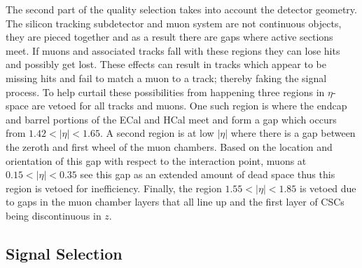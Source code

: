 \documentclass[a4paper,12pt]{article}
\begin{document}
        The second part of the quality selection takes into account the detector
        geometry. The silicon tracking subdetector and muon system are not
        continuous objects, they are pieced together and as a result there are
        gaps where active sections meet. If muons and associated tracks fall
        with these regions they can lose hits and possibly get lost. These
        effects can result in tracks which appear to be missing hits and fail to
        match a muon to a track; thereby faking the signal process. To help
        curtail these possibilities from happening three regions in $\eta$-space
        are vetoed for all tracks and muons. One such region is where the endcap
        and barrel portions of the ECal and HCal meet and form a gap which
        occurs from $1.42 < |\eta| < 1.65$. A second region is at low $|\eta|$
        where there is a gap between the zeroth and first wheel of the muon
        chambers. Based on the location and orientation of this gap with respect
        to the interaction point, muons at $0.15 < |\eta| < 0.35$ see this gap
        as an extended amount of dead space thus this region is vetoed for
        inefficiency.  Finally, the region $1.55 < |\eta| < 1.85$ is vetoed due
        to gaps in the muon chamber layers that all line up and the first layer
        of CSCs being discontinuous in $z$.

    \subsection{Signal Selection}
\end{document}
